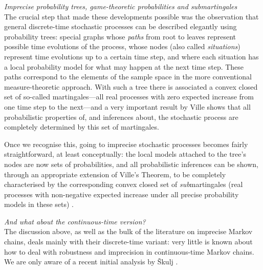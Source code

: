\documentclass[11pt,dvipsnames,usenames,a4paper]{article}
\begin{document}
\vspace{5pt}
\emph{Imprecise probability trees, game-theoretic probabilities and submartingales}\\[5pt]
The crucial step that made these developments possible was the observation that general discrete-time stochastic processes can be described elegantly using probability trees: special graphs whose \emph{paths} from root to leaves represent possible time evolutions of the process, whose nodes (also called \emph{situations}) represent time evolutions up to a certain time step, and where each situation has a local probability model for what may happen at the next time step.
These paths correspond to the elements of the sample space in the more conventional measure-theoretic approach.
With such a tree there is associated a convex closed set of so-called martingales---all real processes with zero expected increase from one time step to the next---and a very important result by Ville \cite{ville1939,shafer2001} shows that all probabilistic properties of, and inferences about, the stochastic process are completely determined by this set of martingales.

Once we recognise this, going to imprecise stochastic processes becomes fairly straightforward, at least conceptually: the local models attached to the tree's nodes are now sets of probabilities, and all probabilistic inferences can be shown, through an appropriate extension of Ville's Theorem, to be completely characterised by the corresponding convex closed set of \emph{sub}martingales (real processes with non-negative expected increase under all precise probability models in these sets) \cite{cooman2007d,cooman2015:markovergodic,cooman2015:isipta:markov}.


\vspace{5pt}
\emph{And what about the continuous-time version?}\\[5pt]
The discussion above, as well as the bulk of the literature on imprecise Markov chains, deals mainly with their discrete-time variant: very little is known about how to deal with robustness and imprecision in continuous-time Markov chains. 
We are only aware of a recent initial analysis by \v{S}kulj \cite{skulj2015:continuous:bounds}.
\end{document}
